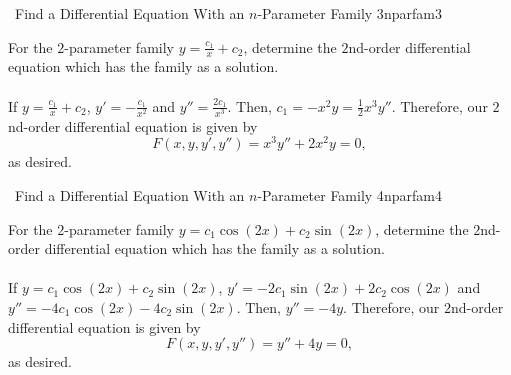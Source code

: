         \begin{example}{\Difficulty\,\Difficulty\,\,Find a Differential Equation With an \(n\)-Parameter Family 3}{nparfam3}
        
            For the \(2\)-parameter family \(y=\frac{c_1}{x}+c_2\), determine the \(2\)nd-order differential equation which has the family as a solution.
            \\
            \\
            If \(y=\frac{c_1}{x}+c_2\), \(y'=-\frac{c_1}{x^2}\) and \(y''=\frac{2c_1}{x^3}\). Then, \(c_1=-x^2y=\frac{1}{2}x^3y''\). Therefore, our \(2\)nd-order differential equation is given by
            \begin{equation*}
                F(x,y,y',y'')=x^3y''+2x^2y=0,
            \end{equation*}
            as desired.
         
         \end{example}
         \begin{example}{\Difficulty\,\Difficulty\,\,Find a Differential Equation With an \(n\)-Parameter Family 4}{nparfam4}
        
            For the \(2\)-parameter family \(y=c_1\cos(2x)+c_2\sin(2x)\), determine the \(2\)nd-order differential equation which has the family as a solution.
            \\
            \\
            If \(y=c_1\cos(2x)+c_2\sin(2x)\), \(y'=-2c_1\sin(2x)+2c_2\cos(2x)\) and \(y''=-4c_1\cos(2x)-4c_2\sin(2x)\). Then, \(y''=-4y\). Therefore, our \(2\)nd-order differential equation is given by
            \begin{equation*}
                F(x,y,y',y'')=y''+4y=0,
            \end{equation*}
            as desired.

         \end{example}